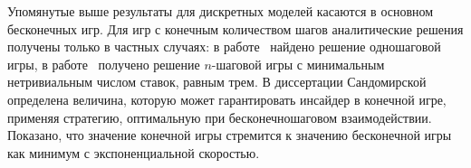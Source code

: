 Упомянутые выше результаты для дискретных моделей касаются в основном
бесконечных игр. Для игр с конечным количеством шагов аналитические решения
получены только в частных случаях: в работе~\cite{sandomirskaya12} найдено
решение одношаговой игры, в работе~\cite{kreps09} получено решение $n$-шаговой
игры с минимальным нетривиальным числом ставок, равным трем. В диссертации
Сандомирской~\cite{phd:sandomirskaya} определена величина, которую может
гарантировать инсайдер в конечной игре, применяя стратегию, оптимальную при
бесконечношаговом взаимодействии. Показано, что значение конечной игры стремится
к значению бесконечной игры как минимум с экспоненциальной скоростью.

